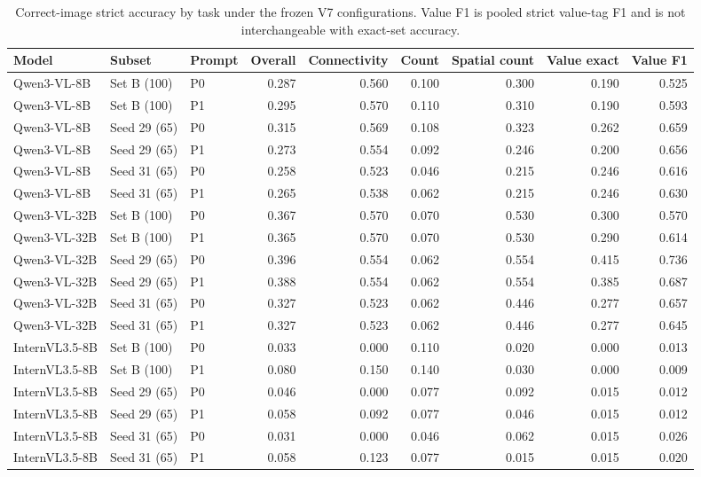 \begin{table}[H]
\centering
\caption{Correct-image strict accuracy by task under the frozen V7 configurations. Value F1 is pooled strict value-tag F1 and is not interchangeable with exact-set accuracy.}
\label{tab:v7_tasks}
\scriptsize
\setlength{\tabcolsep}{4pt}
\begin{tabular}{lllrrrrrr}
\toprule
Model & Subset & Prompt & Overall & Connectivity & Count & Spatial count & Value exact & Value F1 \\
\midrule
Qwen3-VL-8B & Set B (100) & P0 & 0.287 & 0.560 & 0.100 & 0.300 & 0.190 & 0.525 \\
Qwen3-VL-8B & Set B (100) & P1 & 0.295 & 0.570 & 0.110 & 0.310 & 0.190 & 0.593 \\
Qwen3-VL-8B & Seed 29 (65) & P0 & 0.315 & 0.569 & 0.108 & 0.323 & 0.262 & 0.659 \\
Qwen3-VL-8B & Seed 29 (65) & P1 & 0.273 & 0.554 & 0.092 & 0.246 & 0.200 & 0.656 \\
Qwen3-VL-8B & Seed 31 (65) & P0 & 0.258 & 0.523 & 0.046 & 0.215 & 0.246 & 0.616 \\
Qwen3-VL-8B & Seed 31 (65) & P1 & 0.265 & 0.538 & 0.062 & 0.215 & 0.246 & 0.630 \\
Qwen3-VL-32B & Set B (100) & P0 & 0.367 & 0.570 & 0.070 & 0.530 & 0.300 & 0.570 \\
Qwen3-VL-32B & Set B (100) & P1 & 0.365 & 0.570 & 0.070 & 0.530 & 0.290 & 0.614 \\
Qwen3-VL-32B & Seed 29 (65) & P0 & 0.396 & 0.554 & 0.062 & 0.554 & 0.415 & 0.736 \\
Qwen3-VL-32B & Seed 29 (65) & P1 & 0.388 & 0.554 & 0.062 & 0.554 & 0.385 & 0.687 \\
Qwen3-VL-32B & Seed 31 (65) & P0 & 0.327 & 0.523 & 0.062 & 0.446 & 0.277 & 0.657 \\
Qwen3-VL-32B & Seed 31 (65) & P1 & 0.327 & 0.523 & 0.062 & 0.446 & 0.277 & 0.645 \\
InternVL3.5-8B & Set B (100) & P0 & 0.033 & 0.000 & 0.110 & 0.020 & 0.000 & 0.013 \\
InternVL3.5-8B & Set B (100) & P1 & 0.080 & 0.150 & 0.140 & 0.030 & 0.000 & 0.009 \\
InternVL3.5-8B & Seed 29 (65) & P0 & 0.046 & 0.000 & 0.077 & 0.092 & 0.015 & 0.012 \\
InternVL3.5-8B & Seed 29 (65) & P1 & 0.058 & 0.092 & 0.077 & 0.046 & 0.015 & 0.012 \\
InternVL3.5-8B & Seed 31 (65) & P0 & 0.031 & 0.000 & 0.046 & 0.062 & 0.015 & 0.026 \\
InternVL3.5-8B & Seed 31 (65) & P1 & 0.058 & 0.123 & 0.077 & 0.015 & 0.015 & 0.020 \\
\bottomrule
\end{tabular}
\end{table}
